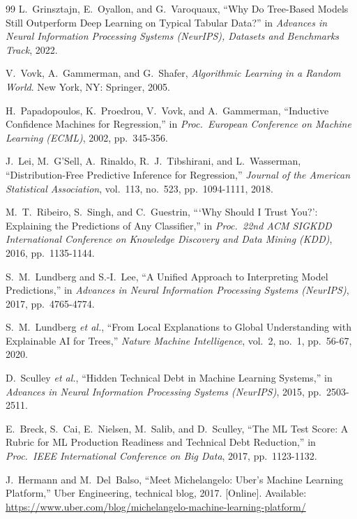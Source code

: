 \begin{thebibliography}{99}
 L.~Grinsztajn, E.~Oyallon, and G.~Varoquaux, ``Why Do
Tree-Based Models Still Outperform Deep Learning on Typical Tabular Data?'' in
\emph{Advances in Neural Information Processing Systems (NeurIPS), Datasets and
Benchmarks Track}, 2022.

 V.~Vovk, A.~Gammerman, and G.~Shafer, \emph{Algorithmic
Learning in a Random World}. New York, NY: Springer, 2005.

 H.~Papadopoulos, K.~Proedrou, V.~Vovk, and A.~Gammerman,
``Inductive Confidence Machines for Regression,'' in \emph{Proc.\ European
Conference on Machine Learning (ECML)}, 2002, pp.~345-356.

 J.~Lei, M.~G'Sell, A.~Rinaldo, R.~J.~Tibshirani, and
L.~Wasserman, ``Distribution-Free Predictive Inference for Regression,''
\emph{Journal of the American Statistical Association}, vol.~113, no.~523,
pp.~1094-1111, 2018.

 M.~T.~Ribeiro, S.~Singh, and C.~Guestrin, ```Why Should I
Trust You?': Explaining the Predictions of Any Classifier,'' in \emph{Proc.\ 22nd
ACM SIGKDD International Conference on Knowledge Discovery and Data Mining
(KDD)}, 2016, pp.~1135-1144.

 S.~M.~Lundberg and S.-I.~Lee, ``A Unified Approach to
Interpreting Model Predictions,'' in \emph{Advances in Neural Information
Processing Systems (NeurIPS)}, 2017, pp.~4765-4774.

 S.~M.~Lundberg \emph{et al.}, ``From Local Explanations to
Global Understanding with Explainable AI for Trees,'' \emph{Nature Machine
Intelligence}, vol.~2, no.~1, pp.~56-67, 2020.

 D.~Sculley \emph{et al.}, ``Hidden Technical Debt in
Machine Learning Systems,'' in \emph{Advances in Neural Information Processing
Systems (NeurIPS)}, 2015, pp.~2503-2511.

 E.~Breck, S.~Cai, E.~Nielsen, M.~Salib, and D.~Sculley,
``The ML Test Score: A Rubric for ML Production Readiness and Technical Debt
Reduction,'' in \emph{Proc.\ IEEE International Conference on Big Data}, 2017,
pp.~1123-1132.

 J.~Hermann and M.~Del~Balso, ``Meet Michelangelo:
Uber's Machine Learning Platform,'' Uber Engineering, technical blog, 2017.
[Online]. Available: \url{https://www.uber.com/blog/michelangelo-machine-learning-platform/}


\end{thebibliography}
